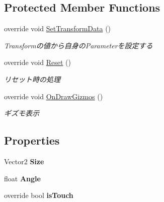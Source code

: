 \subsection*{Protected Member Functions}
\begin{DoxyCompactItemize}
\item 
override void \hyperlink{class_touch_area_box_a5905a11595e6007eaf06308f832cafe4}{Set\+Transform\+Data} ()
\begin{DoxyCompactList}\small\item\em Transformの値から自身の\+Parameterを設定する \end{DoxyCompactList}\item 
override void \hyperlink{class_touch_area_box_a3ee37c987ffa5e7e23d75736e7a46483}{Reset} ()
\begin{DoxyCompactList}\small\item\em リセット時の処理 \end{DoxyCompactList}\item 
override void \hyperlink{class_touch_area_box_ad8e11cacc1d3089309346c13da4f2a88}{On\+Draw\+Gizmos} ()
\begin{DoxyCompactList}\small\item\em ギズモ表示 \end{DoxyCompactList}\end{DoxyCompactItemize}
\subsection*{Properties}
\begin{DoxyCompactItemize}
\item 
Vector2 {\bfseries Size}\hypertarget{class_touch_area_box_a237928de17bd48a0e0c5c63bdf5eeb15}{}\label{class_touch_area_box_a237928de17bd48a0e0c5c63bdf5eeb15}

\item 
float {\bfseries Angle}\hypertarget{class_touch_area_box_adea1cfbb523a9e251efd9fcca9392441}{}\label{class_touch_area_box_adea1cfbb523a9e251efd9fcca9392441}

\item 
override bool {\bfseries is\+Touch}\hypertarget{class_touch_area_box_a883b8e1eba2bc852d71708d678cc46d3}{}\label{class_touch_area_box_a883b8e1eba2bc852d71708d678cc46d3}

\end{DoxyCompactItemize}
